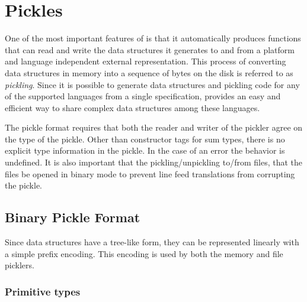 %
\chapter{Pickles}
\label{chap:pickles}

One of the most important features of \asdlgen{} is that it automatically
produces functions that can read and write the data structures it generates
to and from a platform and language independent external
representation.
This process of converting data structures in memory into a
sequence of bytes on the disk is referred to as \emph{pickling}.
Since it is possible to generate data structures and pickling code for
any of the supported languages from a single \asdl{} specification,
\asdlgen{} provides an easy
and efficient way to share complex data structures among these languages.

The \asdl{} pickle format requires that both the reader and writer
of the pickler agree on the type of the pickle.
Other than constructor tags for sum types, there is no explicit type
information in the pickle.
In the case of an error the behavior is undefined.
It is also important that the pickling/unpickling to/from files, that the
files be opened in binary mode to prevent line feed translations from corrupting
the pickle.

\section{Binary Pickle Format}

Since \asdl{} data structures have a tree-like form, they can be represented
linearly with a simple prefix encoding.
This encoding is used by both the memory and file picklers.

\subsection{Primitive types}

